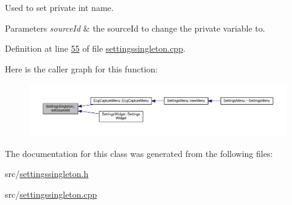 Used to set private int name. 


\begin{DoxyParams}{Parameters}
{\em source\+Id} & the source\+Id to change the private variable to. \\
\hline
\end{DoxyParams}


Definition at line \hyperlink{settingssingleton_8cpp_source_l00055}{55} of file \hyperlink{settingssingleton_8cpp_source}{settingssingleton.\+cpp}.



Here is the caller graph for this function\+:\nopagebreak
\begin{figure}[H]
\begin{center}
\leavevmode
\includegraphics[width=350pt]{classSettingsSingleton_af4b9b4364b4146711000f425dd5f5aa9_icgraph}
\end{center}
\end{figure}




The documentation for this class was generated from the following files\+:\begin{DoxyCompactItemize}
\item 
src/\hyperlink{settingssingleton_8h}{settingssingleton.\+h}\item 
src/\hyperlink{settingssingleton_8cpp}{settingssingleton.\+cpp}\end{DoxyCompactItemize}
